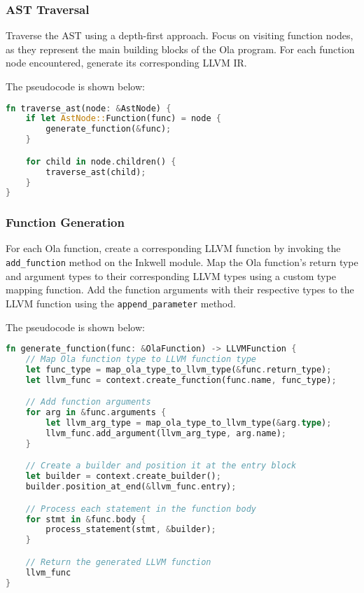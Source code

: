 \subsubsection*{AST Traversal}

Traverse the AST using a depth-first approach. Focus on visiting function nodes, as they represent the main building blocks of the Ola program. For each function node encountered, generate its corresponding LLVM IR.

The pseudocode is shown below:

\begin{lstlisting}[language=Rust]
  fn traverse_ast(node: &AstNode) {
    if let AstNode::Function(func) = node {
        generate_function(&func);
    }

    for child in node.children() {
        traverse_ast(child);
    }
}
\end{lstlisting}

\subsubsection*{Function Generation}

For each Ola function, create a corresponding LLVM function by invoking the \texttt{add\_function} method on the Inkwell module. Map the Ola function's return type and argument types to their corresponding LLVM types using a custom type mapping function. Add the function arguments with their respective types to the LLVM function using the \texttt{append\_parameter} method.

The pseudocode is shown below:

\begin{lstlisting}[language=Rust]
  fn generate_function(func: &OlaFunction) -> LLVMFunction {
    // Map Ola function type to LLVM function type
    let func_type = map_ola_type_to_llvm_type(&func.return_type);
    let llvm_func = context.create_function(func.name, func_type);

    // Add function arguments
    for arg in &func.arguments {
        let llvm_arg_type = map_ola_type_to_llvm_type(&arg.type);
        llvm_func.add_argument(llvm_arg_type, arg.name);
    }

    // Create a builder and position it at the entry block
    let builder = context.create_builder();
    builder.position_at_end(&llvm_func.entry);

    // Process each statement in the function body
    for stmt in &func.body {
        process_statement(stmt, &builder);
    }

    // Return the generated LLVM function
    llvm_func
}
\end{lstlisting}

